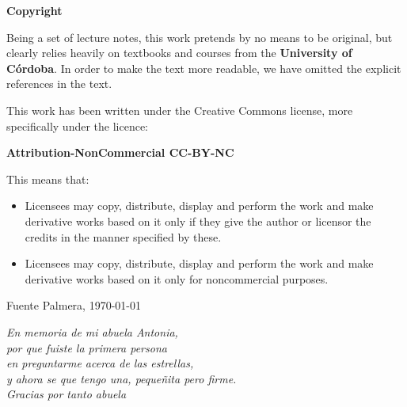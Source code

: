 \documentclass[openany]{book}
\theoremstyle{ucostyle}
\begin{document}
\vspace{0.5cm}

\begin{center}
    \Large \textbf{Copyright}
\end{center}

\vspace{0.5cm}

\noindent Being a set of lecture notes, this work pretends by no means to be original, but clearly relies heavily on textbooks and courses from the \textbf{University of Córdoba}. In order to make the text more readable, we have omitted the explicit references in the text.

\vspace{0.3cm}

\noindent This work has been written under the Creative Commons license, more specifically under the licence:

\begin{center}
    \textbf{Attribution-NonCommercial CC-BY-NC}
\end{center}

\noindent This means that:
\begin{itemize}[label=\textbullet]
    \item Licensees may copy, distribute, display and perform the work and make derivative works based on it only if they give the author or licensor the credits in the manner specified by these.
    \item Licensees may copy, distribute, display and perform the work and make derivative works based on it only for noncommercial purposes.
\end{itemize}

\vspace{1.5cm}

\begin{flushright}
    Fuente Palmera, \today
\end{flushright}
\tableofcontents

\clearpage
\thispagestyle{empty} %

\begin{flushright}
    \textit{En memoria de mi abuela Antonia, \\
    por que fuiste la primera persona \\ en preguntarme acerca de las estrellas, \\ y ahora se que tengo una, pequeñita pero firme.
    \\
    Gracias por tanto abuela}
\end{flushright}
\end{document}
